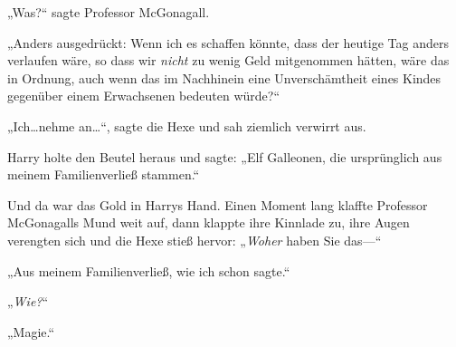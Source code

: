 „Was?“ sagte Professor McGonagall.

„Anders ausgedrückt: Wenn ich es schaffen könnte, dass der heutige Tag anders verlaufen wäre, so dass wir \emph{nicht} zu wenig Geld mitgenommen hätten, wäre das in Ordnung, auch wenn das im Nachhinein eine Unverschämtheit eines Kindes gegenüber einem Erwachsenen bedeuten würde?“

„Ich…nehme an…“, sagte die Hexe und sah ziemlich verwirrt aus.

Harry holte den Beutel heraus und sagte: „Elf Galleonen, die ursprünglich aus meinem Familienverließ stammen.“

Und da war das Gold in Harrys Hand. Einen Moment lang klaffte Professor McGonagalls Mund weit auf, dann klappte ihre Kinnlade zu, ihre Augen verengten sich und die Hexe stieß hervor: „\emph{Woher} haben Sie das—“




„Aus meinem Familienverließ, wie ich schon sagte.“

„\emph{Wie?}“

„Magie.“


